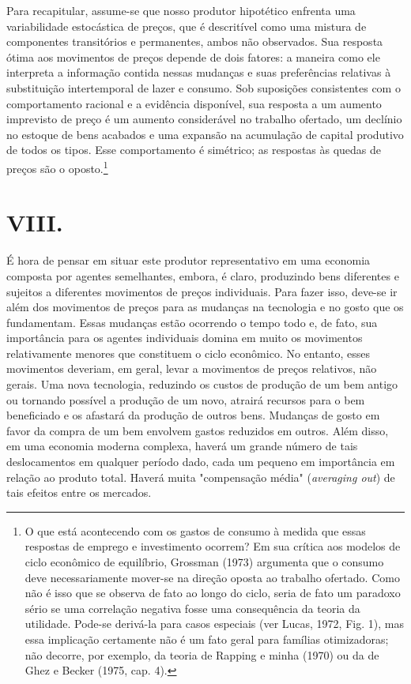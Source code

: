 \documentclass[12pt]{article}
\begin{document}
Para recapitular, assume-se que nosso produtor hipotético enfrenta uma variabilidade estocástica de preços, que é descritível como uma mistura de componentes transitórios e permanentes, ambos não observados. Sua resposta ótima aos movimentos de preços depende de dois fatores: a maneira como ele interpreta a informação contida nessas mudanças e suas preferências relativas à substituição intertemporal de lazer e consumo. Sob suposições consistentes com o comportamento racional e a evidência disponível, sua resposta a um aumento imprevisto de preço é um aumento considerável no trabalho ofertado, um declínio no estoque de bens acabados e uma expansão na acumulação de capital produtivo de todos os tipos. Esse comportamento é simétrico; as respostas às quedas de preços são o oposto.\footnote{O que está acontecendo com os gastos de consumo à medida que essas respostas de emprego e investimento ocorrem? Em sua crítica aos modelos de ciclo econômico de equilíbrio, Grossman (1973) argumenta que o consumo deve necessariamente mover-se na direção oposta ao trabalho ofertado. Como não é isso que se observa de fato ao longo do ciclo, seria de fato um paradoxo sério se uma correlação negativa fosse uma consequência da teoria da utilidade. Pode-se derivá-la para casos especiais (ver Lucas, 1972, Fig. 1), mas essa implicação certamente não é um fato geral para famílias otimizadoras; não decorre, por exemplo, da teoria de Rapping e minha (1970) ou da de Ghez e Becker (1975, cap. 4).}

\section*{VIII.}

É hora de pensar em situar este produtor representativo em uma economia composta por agentes semelhantes, embora, é claro, produzindo bens diferentes e sujeitos a diferentes movimentos de preços individuais. Para fazer isso, deve-se ir além dos movimentos de preços para as mudanças na tecnologia e no gosto que os fundamentam. Essas mudanças estão ocorrendo o tempo todo e, de fato, sua importância para os agentes individuais domina em muito os movimentos relativamente menores que constituem o ciclo econômico. No entanto, esses movimentos deveriam, em geral, levar a movimentos de preços relativos, não gerais. Uma nova tecnologia, reduzindo os custos de produção de um bem antigo ou tornando possível a produção de um novo, atrairá recursos para o bem beneficiado e os afastará da produção de outros bens. Mudanças de gosto em favor da compra de um bem envolvem gastos reduzidos em outros. Além disso, em uma economia moderna complexa, haverá um grande número de tais deslocamentos em qualquer período dado, cada um pequeno em importância em relação ao produto total. Haverá muita "compensação média" (\textit{averaging out}) de tais efeitos entre os mercados.
\end{document}
